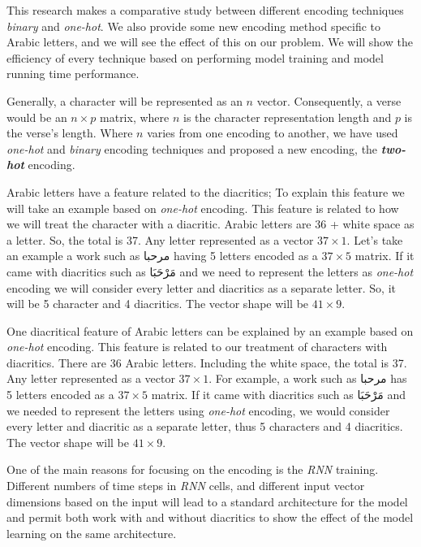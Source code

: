 This research makes a comparative study between different encoding techniques \textit{binary} and \textit{one-hot}. We also provide some new encoding method specific to Arabic letters, and we will see the effect of this on our problem. We will show the efficiency of every technique based on performing model training and model running time performance.

Generally, a character will be represented as an $n$ vector. Consequently, a verse would be an $n \times p$ matrix, where $n$ is the character representation length and $p$ is the verse’s length. Where $n$ varies from one encoding to another, we have used \textit{one-hot} and \textit{binary} encoding techniques and proposed a new encoding, the \textbf{\textit{two-hot}} encoding.

Arabic letters have a feature related to the diacritics; To explain this feature we will take an example based on \textit{\textit{one-hot}} encoding. This feature is related to how we will treat the character with a diacritic. Arabic letters are 36 + white space as a letter. So, the total is 37. Any letter represented as a vector $37 \times 1$. Let's take an example a work such as \textarabic{مرحبا} having 5 letters encoded as a $37 \times 5$ matrix. If it came with diacritics such as \textarabic{مَرْحَبَا} and we need to represent the letters as \textit{one-hot} encoding we will consider every letter and diacritics as a separate letter. So, it will be 5 character and 4 diacritics. The vector shape will be $41 \times 9$.

One diacritical feature of Arabic letters can be explained by an example based on \textit{one-hot} encoding. 
This feature is related to our treatment of characters with diacritics. 
There are 36 Arabic letters. Including the white space, the total is 37. 
Any letter represented as a vector $37 \times 1$. For example, a work such as \textarabic{مرحبا} has 5 letters encoded as a $37 \times 5$ matrix. 
If it came with diacritics such as \textarabic{مَرْحَبَا} and we needed to represent the letters using \textit{one-hot} encoding, we would consider every letter and diacritic as a separate letter, thus 5 characters and 4 diacritics. The vector shape will be $41 \times 9$.

One of the main reasons for focusing on the encoding is the \textit{RNN} training. 
Different numbers of time steps in \textit{RNN} cells, and different input vector dimensions based on the input will lead to a standard architecture for the model and permit both work with and without diacritics to show the effect of the model learning on the same architecture.


